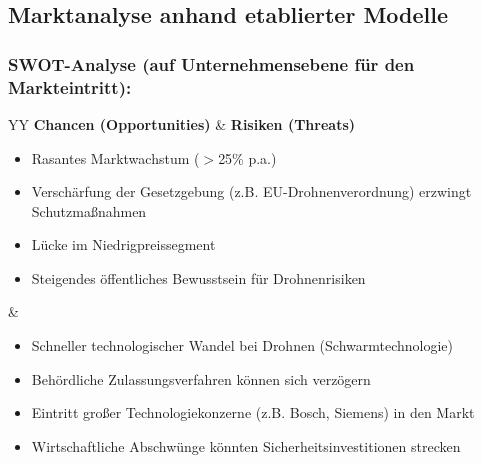 \documentclass[11pt,a4paper]{article}
\begin{document}
\subsection{Marktanalyse anhand etablierter Modelle}

\subsubsection{SWOT-Analyse (auf Unternehmensebene für den Markteintritt):}
\begin{table}[ht]
\centering
\begin{tabularx}{\textwidth}{YY}
\toprule
\textbf{Chancen (Opportunities)} & \textbf{Risiken (Threats)} \\
\midrule
\begin{itemize}
    \item Rasantes Marktwachstum ($>$25\% p.a.)
    \item Verschärfung der Gesetzgebung (z.B. EU-Drohnenverordnung) erzwingt Schutzmaßnahmen
    \item Lücke im Niedrigpreissegment
    \item Steigendes öffentliches Bewusstsein für Drohnenrisiken
\end{itemize}
&
\begin{itemize}
    \item Schneller technologischer Wandel bei Drohnen (Schwarmtechnologie)
    \item Behördliche Zulassungsverfahren können sich verzögern
    \item Eintritt großer Technologiekonzerne (z.B. Bosch, Siemens) in den Markt
    \item Wirtschaftliche Abschwünge könnten Sicherheitsinvestitionen strecken
\end{itemize} \\
\bottomrule
\end{tabularx}
\caption{SWOT-Analyse: Chancen und Risiken}
\end{table}
\end{document}
